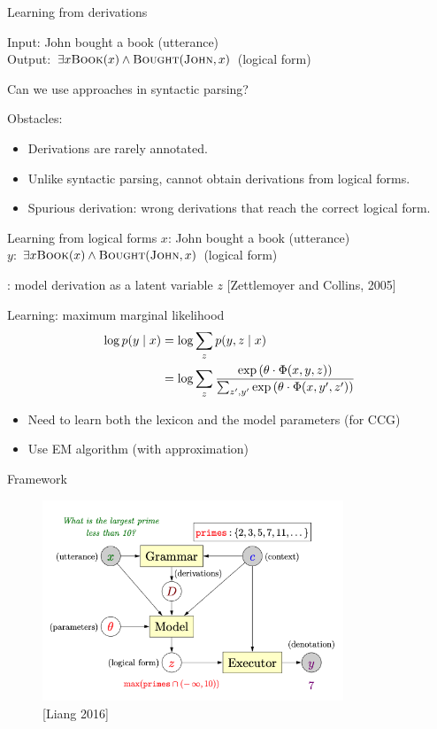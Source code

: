 \documentclass[usenames,dvipsnames,notes]{beamer}
\begin{document}
\begin{frame}
    {Learning from derivations}

    Input: John bought a book (utterance)\\
    Output: $\exists x \textsc{Book}(x) \land \textsc{Bought}(\textsc{John}, x)$ (logical form)

    Can we use approaches in syntactic parsing?

    \pause
    Obstacles:\\
    \begin{itemize}
        \item Derivations are rarely annotated.
        \item Unlike syntactic parsing, cannot obtain derivations from logical forms.
        \item Spurious derivation: wrong derivations that reach the correct logical form.
    \end{itemize}
\end{frame}

\begin{frame}
    {Learning from logical forms}
    $x$: John bought a book (utterance)\\
    $y$: $\exists x \textsc{Book}(x) \land \textsc{Bought}(\textsc{John}, x)$ (logical form)

    : model derivation as a latent variable $z$ [Zettlemoyer and Collins, 2005]

    Learning: maximum marginal likelihood
    \begin{align*}
        \log p(y\mid x) &= \log\sum_z p(y,z\mid x) \\
        &= \log\sum_z \frac{\exp\left( \theta\cdot\Phi(x,y,z) \right)}
        {\sum_{z',y'} \exp\left( \theta\cdot\Phi(x,y',z') \right)}
    \end{align*}
    
    \begin{itemize}
        \item Need to learn both the lexicon and the model parameters (for CCG)
        \item Use EM algorithm (with approximation)
    \end{itemize}
\end{frame}

\begin{frame}
    {Framework}
    \begin{figure}
        \includegraphics[height=6cm]{figures/framework}
        \caption{[Liang 2016]}
    \end{figure}
\end{frame}
\end{document}
